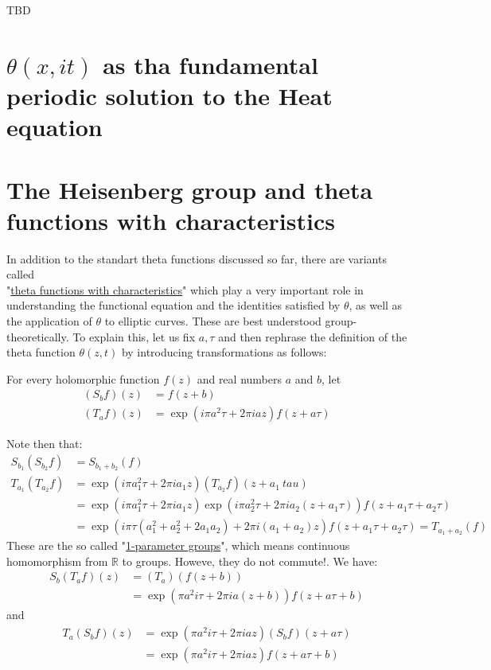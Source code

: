 \documentclass[uplatex,b5j,11pt]{jsbook}
\begin{document}
TBD

\section{$\theta (x, it)$ as tha fundamental periodic solution to the Heat equation}



\section{The Heisenberg group and theta functions with characteristics}
In addition to the standart theta functions discussed so far, there are variants called  \\
"\underline{theta functions with characteristics}" which play a very important role in understanding the functional equation and the identities satisfied by $\theta$, as well as the application of $\theta$ to elliptic curves.
These are best understood group-theoretically.
To explain this, let us fix $a, \tau$ and then rephrase the definition of the theta function $\theta(z,t)$ by introducing transformations as follows:

For every holomorphic function $f(z)$ and real numbers $a$ and $b$, let
\begin{align*}
(S_bf)(z) & = f(z+b) \\
(T_af)(z) & = \exp(i\pi a^2 \tau + 2\pi iaz) f(z+a \tau)
\end{align*}

Note then that:
\begin{align*}
  S_{b_1}(S_{b_2}f) & = S_{b_1 + b_2}(f) \\
  T_{a_1}(T_{a_2}f) & = \exp(i \pi a_1^2 \tau + 2\pi i a_1 z)(T_{a_2}f)(z+ a_1\ tau) \\
   &=\exp(i \pi a_1^2 \tau + 2\pi i a_1 z)\exp(i \pi a_2^2 \tau + 2\pi i a_2 (z +a_1 \tau))f(z + a_1 \tau + a_2 \tau) \\
   & = \exp(i\pi \tau (a_1^2 + a_2^2 + 2a_1a_2) + 2 \pi i (a_1 + a_2)z) f(z + a_1 \tau + a_2 \tau) = T_{a_1 + a_2}(f)
\end{align*}
These are the so called "\underline{1-parameter groups}", which means continuous homomorphism from $\mathbb{R}$ to groups.
Howeve, they do not commute!. We have:
\begin{align*}
  S_b(T_af)(z) &= (T_a)(f(z+b)) \\
              & = \exp(\pi a^2 i \tau + 2\pi ia(z+b)) f(z+a\tau + b)
\end{align*}
and
\begin{align*}
T_a(S_bf)(z)   & = \exp(\pi a^2 i \tau + 2\pi iaz) (S_bf)(z+a\tau) \\
   & = \exp(\pi a^2 i \tau + 2\pi iaz) f(z+a\tau + b)
\end{align*}
\end{document}
